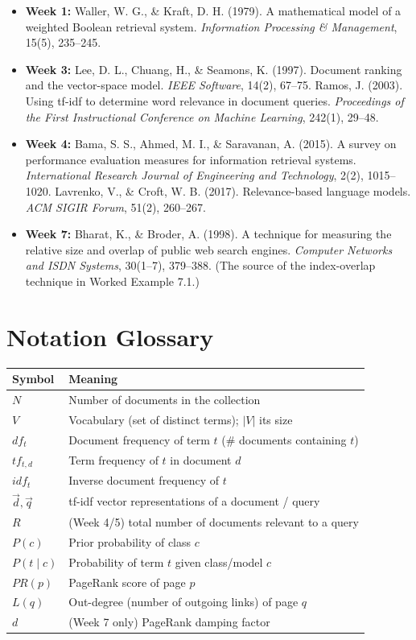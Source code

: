 \documentclass[11pt, a4paper]{article}
\begin{document}
\begin{itemize}
  \item \textbf{Week 1:} Waller, W. G., \& Kraft, D. H. (1979). A mathematical model of a weighted Boolean retrieval system. \textit{Information Processing \& Management}, 15(5), 235--245.
  \item \textbf{Week 3:} Lee, D. L., Chuang, H., \& Seamons, K. (1997). Document ranking and the vector-space model. \textit{IEEE Software}, 14(2), 67--75. \quad Ramos, J. (2003). Using tf-idf to determine word relevance in document queries. \textit{Proceedings of the First Instructional Conference on Machine Learning}, 242(1), 29--48.
  \item \textbf{Week 4:} Bama, S. S., Ahmed, M. I., \& Saravanan, A. (2015). A survey on performance evaluation measures for information retrieval systems. \textit{International Research Journal of Engineering and Technology}, 2(2), 1015--1020. \quad Lavrenko, V., \& Croft, W. B. (2017). Relevance-based language models. \textit{ACM SIGIR Forum}, 51(2), 260--267.
  \item \textbf{Week 7:} Bharat, K., \& Broder, A. (1998). A technique for measuring the relative size and overlap of public web search engines. \textit{Computer Networks and ISDN Systems}, 30(1--7), 379--388. (The source of the index-overlap technique in Worked Example 7.1.)
\end{itemize}

\section*{Notation Glossary}

\begin{center}
\begin{tabular}{@{}lp{11.5cm}@{}}
\toprule
Symbol & Meaning \\
\midrule
$N$ & Number of documents in the collection \\
$V$ & Vocabulary (set of distinct terms); $|V|$ its size \\
$df_t$ & Document frequency of term $t$ (\# documents containing $t$) \\
$tf_{t,d}$ & Term frequency of $t$ in document $d$ \\
$idf_t$ & Inverse document frequency of $t$ \\
$\vec d,\vec q$ & tf-idf vector representations of a document / query \\
$R$ & (Week 4/5) total number of documents relevant to a query \\
$P(c)$ & Prior probability of class $c$ \\
$P(t\mid c)$ & Probability of term $t$ given class/model $c$ \\
$PR(p)$ & PageRank score of page $p$ \\
$L(q)$ & Out-degree (number of outgoing links) of page $q$ \\
$d$ & (Week 7 only) PageRank damping factor \\
\bottomrule
\end{tabular}
\end{center}
\end{document}
